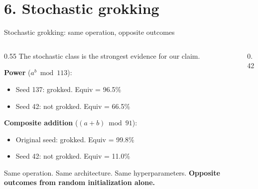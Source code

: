 \documentclass[aspectratio=169,11pt]{beamer}
\begin{document}
\section{6. Stochastic grokking}

\begin{frame}{Stochastic grokking: same operation, opposite outcomes}

\begin{columns}[T]
\begin{column}{0.55\textwidth}
{\small The stochastic class is the strongest evidence for our claim.}

\vspace{0.3em}
{\small \textbf{Power} ($a^b \bmod 113$):}
\begin{itemize}
  \item {\small Seed 137: grokked. Equiv = 96.5\%}
  \item {\small Seed 42: not grokked. Equiv = 66.5\%}
\end{itemize}

\vspace{0.3em}
{\small \textbf{Composite addition} ($(a+b) \bmod 91$):}
\begin{itemize}
  \item {\small Original seed: grokked. Equiv = 99.8\%}
  \item {\small Seed 42: not grokked. Equiv = 11.0\%}
\end{itemize}

\vspace{0.3em}
{\small Same operation. Same architecture. Same hyperparameters. \textbf{Opposite outcomes from random initialization alone.}}

\vspace{0.3em}
\end{column}
\begin{column}{0.42\textwidth}
\end{column}
\end{columns}
\end{frame}
\end{document}
